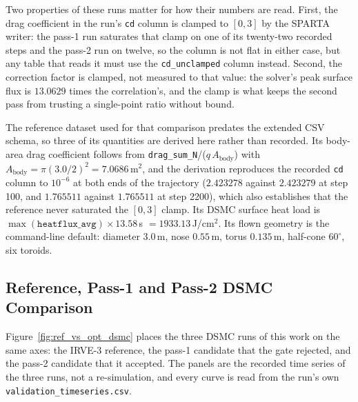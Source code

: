 Two properties of these runs matter for how their numbers are read. First, the drag coefficient in the
run's \texttt{cd} column is clamped to $[0,3]$ by the SPARTA writer: the pass-1 run saturates that
clamp on one of its twenty-two recorded steps and the pass-2 run on twelve, so the column is not flat in
either case, but any table that reads it must use the \texttt{cd\_unclamped} column instead. Second,
the correction factor is clamped, not measured to that value: the solver's peak surface flux is
$13.0629$ times the correlation's, and the clamp is what keeps the second pass from trusting a
single-point ratio without bound.

The reference dataset used for that comparison predates the extended CSV schema, so three of its
quantities are derived here rather than recorded. Its body-area drag coefficient follows from
\texttt{drag\_sum\_N}/($q\,A_{\mathrm{body}}$) with $A_{\mathrm{body}} = \pi(3.0/2)^2 =
7.0686$\,m$^2$, and the derivation reproduces the recorded \texttt{cd} column to $10^{-6}$ at
both ends of the trajectory ($2.423278$ against $2.423279$ at step 100, and $1.765511$ against
$1.765511$ at step 2200), which also establishes that the reference never saturated the $[0,3]$ clamp.
Its DSMC surface heat load is $\max(\texttt{heatflux\_avg})\times 13.58$\,s $= 1933.13$\,J/cm$^2$.
Its flown geometry is the command-line default: diameter $3.0$\,m, nose $0.55$\,m, torus $0.135$\,m,
half-cone $60^\circ$, six toroids.

\subsection{Reference, Pass-1 and Pass-2 DSMC Comparison}
Figure~\ref{fig:ref_vs_opt_dsmc} places the three DSMC runs of this work on the same axes: the IRVE-3 reference, the pass-1 candidate that the gate rejected, and the pass-2 candidate that it accepted. The panels are the recorded time series of the three runs, not a re-simulation, and every curve is read from the run's own \texttt{validation\_timeseries.csv}.

